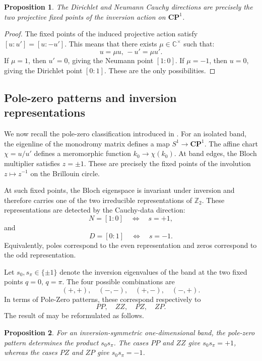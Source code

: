 \documentclass[preprint,12pt]{elsarticle}
\newtheorem{prop}{Proposition}
\newtheorem{proof}{Proof}
\begin{document}
\begin{prop}
The Dirichlet and Neumann Cauchy directions are precisely the two projective fixed points of the inversion action on $\mathbf{CP}^1$.
\end{prop}

\begin{proof}
The fixed points of the induced projective action satisfy $[u:u']=[u:-u']$.
This means that there exists $\mu \in\mathbb C^\times$ such that:
$$
u=\mu u,\, -u'=\mu u'.
$$
If $\mu=1$, then $u'=0$, giving the Neumann point $[1:0]$. If $\mu=-1$, then $u=0$, giving the Dirichlet point $[0:1]$. These are the only possibilities.
\end{proof}

\subsection{Pole-zero patterns and inversion representations}

We now recall the pole-zero classification introduced in \cite{FelbacqAnnalen}. For an isolated band, the eigenline of the monodromy matrix defines a map $S^1\longrightarrow \mathbf{CP}^1$.
The affine chart $\chi=u/u'$ defines a meromorphic function $k_0 \to \chi(k_0)$. At band edges, the Bloch multiplier satisfies
$z=\pm1$.
These are precisely the fixed points of the involution $z\longmapsto z^{-1}$ on the Brillouin circle.

At such fixed points, the Bloch eigenspace is invariant under inversion and therefore carries one of the two irreducible representations of $\mathbb Z_2$. These representations are detected by the Cauchy-data direction:
$$
N=[1:0]\quad \Longleftrightarrow \quad s=+1,
$$
and
$$
D=[0:1]\quad \Longleftrightarrow \quad s=-1.
$$
Equivalently, poles correspond to the even representation and zeros correspond to the odd representation.

Let $s_0,s_\pi\in \{\pm1 \}$ denote the inversion eigenvalues of the band at the two fixed points $q=0,\, q=\pi$.
The four possible combinations are
$$
(+,+),\quad (-,-),\quad (+,-),\quad (-,+).
$$
In terms of Pole-Zero patterns, these correspond respectively to
$$
PP,\quad ZZ,\quad PZ,\quad ZP.
$$
The result of \cite{FelbacqAnnalen} may be reformulated as follows.
\begin{prop}
For an inversion-symmetric one-dimensional band, the pole-zero pattern determines the product
$s_0s_\pi$.
The cases $PP$ and $ZZ$ give $s_0s_\pi=+1$,
whereas the cases $PZ$ and $ZP$ give $s_0s_\pi=-1$.
\end{prop}
\end{document}
